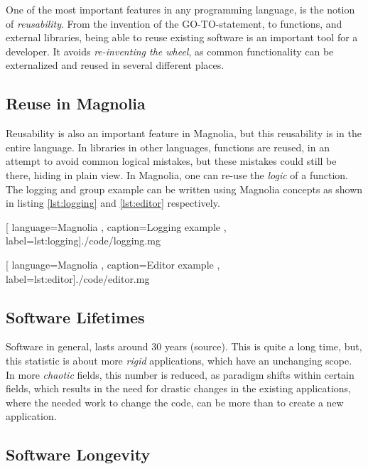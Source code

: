 One of the most important features in any programming language, is the notion
of \textit{reusability}. From the invention of the GO-TO-statement,
to functions, and external libraries, being able to reuse existing software is
an important tool for a developer. It avoids \textit{re-inventing the wheel}, as
common functionality can be externalized and reused in several different places.

\subsection{Reuse in Magnolia}

Reusability is also an important feature in Magnolia, but this reusability is in
the entire language. In libraries in other languages, functions are reused, in
an attempt to avoid common logical mistakes, but these mistakes could still be
there, hiding in plain view. In Magnolia, one can re-use the \textit{logic} of a
function. The logging and group example can be written using Magnolia concepts
as shown in listing \ref{lst:logging} and \ref{lst:editor} respectively.

\begin{center}
  
    [ language=Magnolia
    , caption={Logging example}
    , label=lst:logging]{./code/logging.mg}
\end{center}

\begin{center}
  
    [ language=Magnolia
    , caption={Editor example}
    , label=lst:editor]{./code/editor.mg}
\end{center}

\subsection{Software Lifetimes}

Software in general, lasts around 30 years (source). This is quite a long time,
but, this statistic is about more \textit{rigid} applications, which have an
unchanging scope. In more \textit{chaotic} fields, this number is reduced, as
paradigm shifts within certain fields, which results in the need for drastic
changes in the existing applications, where the needed work to change the code,
can be more than to create a new application.

\subsection{Software Longevity}


